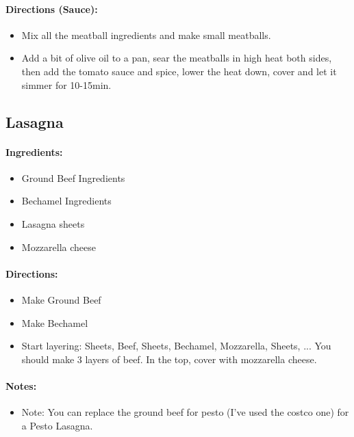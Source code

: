 \documentclass{article}
\begin{document}
\paragraph{Directions (Sauce):}
\begin{itemize}
    \item Mix all the meatball ingredients and make small meatballs.
    \item Add a bit of olive oil to a pan, sear the meatballs in high heat both sides, then add the tomato sauce and spice, lower the heat down, cover and let it simmer for 10-15min.
\end{itemize} 

\subsection{Lasagna}

\paragraph{Ingredients:}
\begin{itemize}
    \item Ground Beef Ingredients
    \item Bechamel Ingredients
    \item Lasagna sheets
    \item Mozzarella cheese
\end{itemize}

\paragraph{Directions:}
\begin{itemize}
    \item Make Ground Beef
    \item Make Bechamel
    \item Start layering: Sheets, Beef, Sheets, Bechamel, Mozzarella, Sheets, ... You should make 3 layers of beef. In the top, cover with mozzarella cheese.
\end{itemize}

\paragraph{Notes:}
\begin{itemize}
    \item Note: You can replace the ground beef for pesto (I’ve used the costco one) for a Pesto Lasagna.
\end{itemize}
\end{document}
